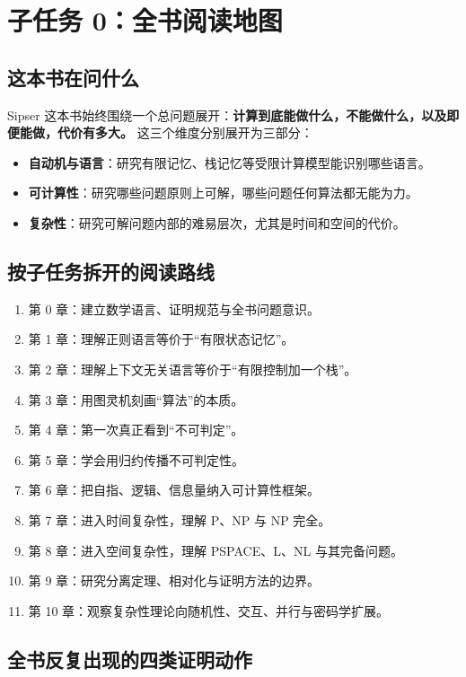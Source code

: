 \section{子任务 0：全书阅读地图}

\subsection{这本书在问什么}

Sipser 这本书始终围绕一个总问题展开：\textbf{计算到底能做什么，不能做什么，以及即便能做，代价有多大。}
这三个维度分别展开为三部分：
\begin{itemize}[leftmargin=2em]
  \item \textbf{自动机与语言}：研究有限记忆、栈记忆等受限计算模型能识别哪些语言。
  \item \textbf{可计算性}：研究哪些问题原则上可解，哪些问题任何算法都无能为力。
  \item \textbf{复杂性}：研究可解问题内部的难易层次，尤其是时间和空间的代价。
\end{itemize}

\subsection{按子任务拆开的阅读路线}

\begin{enumerate}[leftmargin=2em]
  \item 第 0 章：建立数学语言、证明规范与全书问题意识。
  \item 第 1 章：理解正则语言等价于“有限状态记忆”。
  \item 第 2 章：理解上下文无关语言等价于“有限控制加一个栈”。
  \item 第 3 章：用图灵机刻画“算法”的本质。
  \item 第 4 章：第一次真正看到“不可判定”。
  \item 第 5 章：学会用归约传播不可判定性。
  \item 第 6 章：把自指、逻辑、信息量纳入可计算性框架。
  \item 第 7 章：进入时间复杂性，理解 P、NP 与 NP 完全。
  \item 第 8 章：进入空间复杂性，理解 PSPACE、L、NL 与其完备问题。
  \item 第 9 章：研究分离定理、相对化与证明方法的边界。
  \item 第 10 章：观察复杂性理论向随机性、交互、并行与密码学扩展。
\end{enumerate}

\subsection{全书反复出现的四类证明动作}

